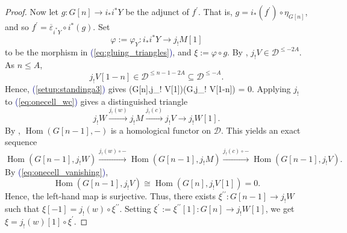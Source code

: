 \documentclass[11pt]{amsart}
\def\eqref#1{\textcolor{darkblue}{(\ref{#1})}}
\let\oldequation\equation
\let\oldendequation\endequation
\renewenvironment{equation}{\linenomathNonumbers\oldequation}{\oldendequation\endlinenomath}
\theoremstyle{plain}
\theoremstyle{definition}
\numberwithin{equation}{section}
\numberwithin{theorem}{section}
\begin{document}
\begin{proof}
    Now let $g\colon G[n]\to i_\ast i^\ast Y$ be the adjunct of $f^\prime$.
    That is, $g = i_\ast(f^\prime)\circ \eta_{G[n]}$, and so $f^\prime = \overline{\varepsilon}_{i^\ast Y}\circ i^\ast(g)$.
    Set
    \begin{displaymath}
        \varphi := \varphi_Y\colon i_\ast i^\ast Y\to j_! M[1]
    \end{displaymath}
    to be the morphism in \eqref{eq:gluing_triangles}, and $\xi := \varphi\circ g$. 
    By , $j_! V\in \mathcal{D}^{\leq -2A}$.
    As $n\leq A$, 
    \begin{displaymath}
        j_! V[1-n]\in \mathcal{D}^{\leq n-1-2A}\subseteq \mathcal{D}^{\leq -A}.
    \end{displaymath}
    Hence, \eqref{setup:standinga3} gives
    \begin{equation}
        \label{eq:onecell_vanishing}
        (G[n],j_! V[1])\cong {}(G,j_! V[1-n]) = 0.
    \end{equation}
    Applying $j_!$ to \eqref{eq:onecell_wc} gives a distinguished triangle
    \begin{displaymath}
        j_! W\xrightarrow{j_!(w)} j_! M \xrightarrow{j_!(c)} j_! V\to j_! W[1].
    \end{displaymath}
    By \cite[Lemma 1.1.10]{Neeman:2001}, $\operatorname{Hom}(G[n-1],-)$ is a homological functor on $\mathcal{D}$.
    This yields an exact sequence
    \begin{displaymath}
        \operatorname{Hom}(G[n-1],j_! W)
        \xrightarrow{j_!(w)\circ -} \operatorname{Hom}(G[n-1],j_! M)
        \xrightarrow{j_!(c)\circ -} \operatorname{Hom}(G[n-1],j_! V).
    \end{displaymath}
    By \eqref{eq:onecell_vanishing}, 
    \begin{displaymath}
        \operatorname{Hom}(G[n-1],j_! V)\cong \operatorname{Hom}(G[n],j_! V[1]) = 0.
    \end{displaymath}
    Hence, the left-hand map is surjective.
    Thus, there exists $\xi^{\prime\prime}\colon G[n-1]\to j_! W$ such that $\xi[-1] = j_!(w)\circ \xi^{\prime\prime}$.
    Setting $\xi^\prime := \xi^{\prime\prime}[1]\colon G[n]\to j_! W[1]$, we get $\xi = j_!(w)[1]\circ \xi^\prime$.


\end{proof}
\end{document}
